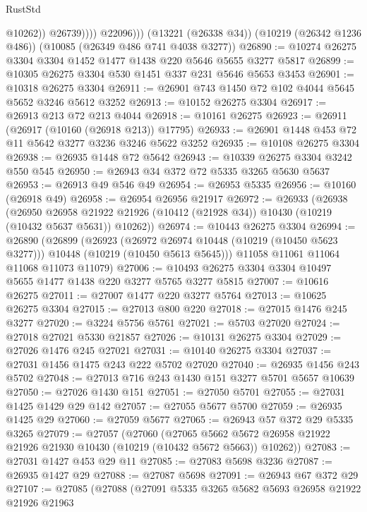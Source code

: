 \begin{lexlean}{RustStd}
\begin{coremodule}
                      @10262))
                  @26739))))
          @22096)))
    (@13221 (@26338 @34))
    (@10219 (@26342 @1236 @486))
    (@10085 (@26349 @486 @741 @4038 @3277))
@26890 := @10274 @26275 @3304 @3304 @1452 @1477 @1438 @220 @5646 @5655 @3277 @5817
@26899 := @10305 @26275 @3304 @530 @1451 @337 @231 @5646 @5653 @3453
@26901 := @10318 @26275 @3304
@26911 := @26901 @743 @1450 @72 @102 @4044 @5645 @5652 @3246 @5612 @3252
@26913 := @10152 @26275 @3304
@26917 := @26913 @213 @72 @213 @4044
@26918 := @10161 @26275
@26923 := @26911 (@26917 (@10160 (@26918 @213)) @17795)
@26933 := @26901 @1448 @453 @72 @11 @5642 @3277 @3236 @3246 @5622 @3252
@26935 := @10108 @26275 @3304
@26938 := @26935 @1448 @72 @5642
@26943 := @10339 @26275 @3304 @3242 @550 @545
@26950 := @26943 @34 @372 @72 @5335 @3265 @5630 @5637
@26953 := @26913 @49 @546 @49
@26954 := @26953 @5335
@26956 := @10160 (@26918 @49)
@26958 := @26954 @26956 @21917
@26972 := @26933
    (@26938
      (@26950
        @26958
        @21922
        @21926
        (@10412 (@21928 @34))
        @10430
        (@10219 (@10432 @5637 @5631))
        @10262))
@26974 := @10443 @26275 @3304
@26994 := @26890
    (@26899
      (@26923
        (@26972 @26974 @10448 (@10219 (@10450 @5623 @3277)))
        @10448
        (@10219 (@10450 @5613 @5645)))
      @11058
      @11061
      @11064
      @11068
      @11073
      @11079)
@27006 := @10493 @26275 @3304 @3304 @10497 @5655 @1477 @1438 @220 @3277 @5765 @3277 @5815
@27007 := @10616 @26275
@27011 := @27007 @1477 @220 @3277 @5764
@27013 := @10625 @26275 @3304
@27015 := @27013 @800 @220
@27018 := @27015 @1476 @245 @3277
@27020 := @3224 @5756 @5761
@27021 := @5703 @27020
@27024 := @27018 @27021 @5330 @21857
@27026 := @10131 @26275 @3304
@27029 := @27026 @1476 @245 @27021
@27031 := @10140 @26275 @3304
@27037 := @27031 @1456 @1475 @243 @222 @5702 @27020
@27040 := @26935 @1456 @243 @5702
@27048 := @27013 @716 @243 @1430 @151 @3277 @5701 @5657 @10639
@27050 := @27026 @1430 @151
@27051 := @27050 @5701
@27055 := @27031 @1425 @1429 @29 @142
@27057 := @27055 @5677 @5700
@27059 := @26935 @1425 @29
@27060 := @27059 @5677
@27065 := @26943 @57 @372 @29 @5335 @3265
@27079 := @27057
    (@27060
      (@27065 @5662 @5672 @26958 @21922 @21926 @21930 @10430 (@10219 (@10432 @5672 @5663)) @10262))
@27083 := @27031 @1427 @453 @29 @11
@27085 := @27083 @5698 @3236
@27087 := @26935 @1427 @29
@27088 := @27087 @5698
@27091 := @26943 @67 @372 @29
@27107 := @27085
    (@27088
      (@27091
        @5335
        @3265
        @5682
        @5693
        @26958
        @21922
        @21926
        @21963

\end{coremodule}
\end{lexlean}
